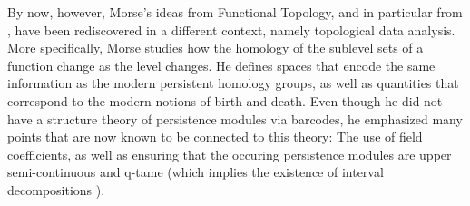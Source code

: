 By now, however, Morse's ideas from Functional Topology, and in particular from \cite{Morse.1940}, have been rediscovered in a different context, namely topological data analysis. More specifically, Morse studies how the homology of the sublevel sets of a function change as the level changes. He defines spaces that encode the same information as the modern persistent homology groups, as well as quantities that correspond to the modern notions of birth and death. Even though he did not have a structure theory of persistence modules via barcodes, he emphasized many points that are now known to be connected to this theory: The use of field coefficients, as well as ensuring that the occuring persistence modules are upper semi-continuous and q-tame (which implies the existence of interval decompositions \cite{schmahl2020structure}).